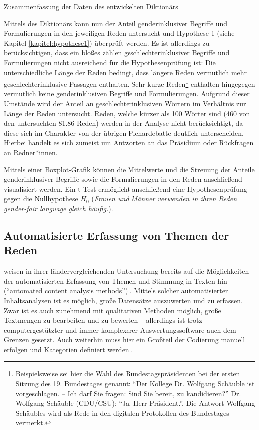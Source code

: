 \documentclass[12pt, 
    twoside=false, 
    bibliography=totoc, 
    numbers=endperiod, 
    headings=normal, 
    toc=chapterentrydotfill
    ]{scrbook}
\begin{document}
\begin{table}[htb]
    \centering
    \caption[Zusammenfassung der Daten des entwickelten Diktionärs]{Zusammenfassung der Daten des entwickelten Diktionärs}
    
    \label{table:zusammenfassung_dict}
\end{table}

Mittels des Diktionärs kann nun der Anteil genderinklusiver Begriffe und Formulierungen in den jeweiligen Reden untersucht und Hypothese 1 (siehe Kapitel \ref{kapitel:hypothese1}) überprüft werden. Es ist allerdings zu berücksichtigen, dass ein bloßes zählen geschlechterinklusiver Begriffe und Formulierungen nicht ausreichend für die Hypothesenprüfung ist:
Die unterschiedliche Länge der Reden bedingt, dass längere Reden vermutlich mehr geschlechterinklusive Passagen enthalten. Sehr kurze Reden\footnote{Beispielsweise sei hier die Wahl des Bundestagspräsidenten bei der ersten Sitzung des 19. Bundestages genannt: \enquote{Der Kollege Dr. Wolfgang Schäuble ist vorgeschlagen. – Ich darf Sie fragen: Sind Sie bereit, zu kandidieren?} Dr. Wolfgang Schäuble (CDU/CSU): \enquote{Ja, Herr Präsident.}. Die Antwort Wolfgang Schäubles wird als Rede in den digitalen Protokollen des Bundestages vermerkt.} enthalten hingegegen vermutlich keine genderinklusiven Begriffe und Formulierungen. Aufgrund dieser Umstände wird der Anteil an geschlechterinklusiven Wörtern im Verhältnis zur Länge der Reden untersucht. 
Reden, welche kürzer als 100 Wörter sind (460 von den untersuchten 81.86 Reden) werden in der Analyse nicht berücksichtigt, da diese sich im Charakter von der übrigen Plenardebatte deutlich unterscheiden. Hierbei handelt es sich zumeist um Antworten an das Präsidium oder Rückfragen an Redner*innen.

Mittels einer Boxplot-Grafik können die Mittelwerte und die Streuung der Anteile genderinklusiver Begriffe sowie die Formulierungen in den Reden anschließend visualisiert werden. Ein t-Test \parencite[vgl.][164ff.]{diaz-bone_2018} ermöglicht anschließend eine Hypothesenprüfung gegen die Nullhypothese $H_0$ (\emph{Frauen und Männer verwenden in ihren Reden gender-fair language gleich häufig.}).

\subsection{Automatisierte Erfassung von Themen der Reden}

\citeauthor{back_2018} weisen in ihrer ländervergleichenden Untersuchung bereits auf die Möglichkeiten der automatisierten Erfassung von Themen und Stimmung in Texten hin (\enquote{automated
content analysis methods}) \parencite*[18]{back_2018}. Mittels solcher automatisierter Inhaltsanalysen ist es möglich, große Datensätze auszuwerten und zu erfassen. Zwar ist es auch zunehmend mit qualitativen Methoden möglich, große Textmengen zu bearbeiten und zu bewerten \parencite[vgl.][]{raediker_2019} -- allerdings ist trotz computergestützter und immer komplexerer Auswertungssoftware auch dem Grenzen gesetzt. Auch weiterhin muss hier ein Großteil der Codierung manuell erfolgen und Kategorien definiert werden  \parencite[52f.]{raediker_2019}. 
\end{document}
